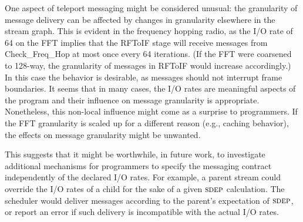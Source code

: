 One aspect of teleport messaging might be considered unusual: the
granularity of message delivery can be affected by changes in
granularity elsewhere in the stream graph.  This is evident in the
frequency hopping radio, as the I/O rate of 64 on the FFT implies that
the RFToIF stage will receive messages from Check\_Freq\_Hop at most
once every 64 iterations.  (If the FFT were coarsened to 128-way, the
granularity of messages in RFToIF would increase accordingly.)  In
this case the behavior is desirable, as messages should not interrupt
frame boundaries.  It seems that in many cases, the I/O rates are
meaningful aspects of the program and their influence on message
granularity is appropriate.  Nonetheless, this non-local influence
might come as a surprise to programmers.  If the FFT granularity is
scaled up for a different reason (e.g., caching behavior), the effects
on message granularity might be unwanted.

This suggests that it might be worthwhile, in future work, to
investigate additional mechanisms for programmers to specify the
messaging contract independently of the declared I/O rates.  For
example, a parent stream could override the I/O rates of a child for
the sake of a given $\textsc{sdep}$ calculation.  The scheduler would deliver
messages according to the parent's expectation of $\textsc{sdep}$, or report
an error if such delivery is incompatible with the actual I/O rates.
